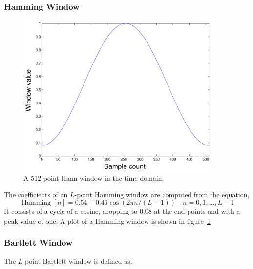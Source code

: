 \subsubsection{Hamming Window}

\begin{figure}
\centerline{\includegraphics[width=4in]{ch-fft/ufft_hamming_w512}}
\caption{A 512-point Hann window in the time domain.\label{fig:ufft-hmw}}
\end{figure}

The
coefficients of an $L$-point Hamming window are computed from the
equation,
\begin{equation}
\operatorname{Hamming}[n]
    = 0.54 - 0.46 \cos(2\pi n/(L-1))
          \quad n=0,1,\ldots,L-1
\label{eq:ufft-hnw}
\end{equation}
It consists of a cycle of a cosine, dropping to 0.08 at the end-points
and with a peak value of one. A plot of a Hamming window is shown in
figure~\ref{fig:ufft-hmw}

\subsubsection{Bartlett Window}

The $L$-point Bartlett window is defined as:

